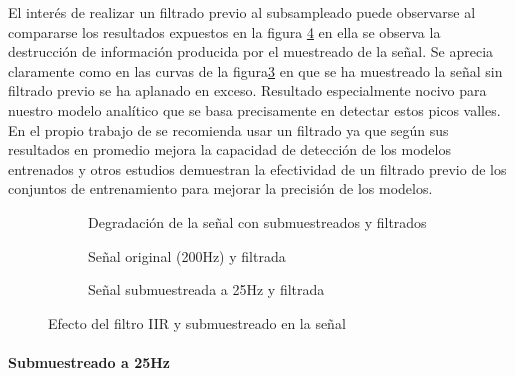 \begin{comment}
\end{comment}

El interés de realizar un filtrado previo al subsampleado puede observarse al compararse los resultados expuestos en la figura \ref{fig:iir} en ella se observa la destrucción de información producida por el muestreado de la señal. Se aprecia claramente como en las curvas de la figura\ref{fig:signalIIRFilter25} en que se ha muestreado la señal sin filtrado previo se ha aplanado en exceso. Resultado especialmente nocivo para nuestro modelo analítico que se basa precisamente en detectar estos picos valles. En el propio trabajo de  se recomienda usar un filtrado ya que según sus resultados en promedio mejora la capacidad de detección de los modelos entrenados y otros estudios \cite{Xiao2016,Tian2019,Liu2020} demuestran la efectividad de un filtrado previo de los conjuntos de entrenamiento para mejorar la precisión de los modelos.

\begin{figure}[htb!]
  \centering
  \begin{subfigure}[b]{0.96\textwidth}
      \centering
      \caption{Degradación de la señal con submuestreados y filtrados}
      \label{fig:downsample}
  \end{subfigure}
  \centering

  \begin{subfigure}[b]{0.48\textwidth}
      \centering
      \caption{Señal original (200Hz) y filtrada}
      \label{fig:signalIIRFilter}
  \end{subfigure}
  \hfill
  \begin{subfigure}[b]{0.48\textwidth}
      \centering
      \caption{Señal submuestreada a 25Hz y filtrada}
      \label{fig:signalIIRFilter25}
  \end{subfigure}
  \caption{\label{fig:iir}  Efecto del filtro IIR y submuestreado en la señal}
\end{figure}

\paragraph{Submuestreado a 25Hz}

